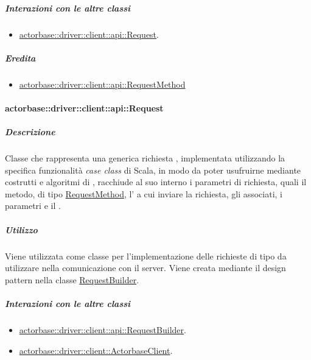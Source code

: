 \documentclass{scalatekids-article}
\begin{document}
\subparagraph{Interazioni con le altre classi}

\begin{itemize}
\item \hyperref[sec:actorbase::driver::client::api::Request]{actorbase::driver::client::api::Request}.
\end{itemize}

\subparagraph{Eredita}

\begin{itemize}
\item \hyperref[sec:actorbase::driver::client::api::RequestMethod]{actorbase::driver::client::api::RequestMethod}
\end{itemize}


\paragraph{actorbase::driver::client::api::Request}
\label{sec:actorbase::driver::client::api::Request}

\subparagraph{Descrizione}

Classe che rappresenta una generica richiesta , implementata
utilizzando la specifica funzionalità \textit{case class} di Scala, in modo da
poter usufruirne mediante costrutti e algoritmi di ,
racchiude al suo interno i parametri di richiesta, quali il metodo, di tipo
\hyperref[sec:actorbase::driver::client::api::RequestMethod]{RequestMethod},
l' a cui inviare la richiesta, gli  
associati, i parametri e il .

\subparagraph{Utilizzo}

Viene utilizzata come classe per l'implementazione delle richieste 
di tipo  da utilizzare nella comunicazione con il server. Viene
creata mediante il design pattern  nella classe
\hyperref[sec:actorbase::driver::client::api::RequestBuilder]{RequestBuilder}.

\subparagraph{Interazioni con le altre classi}

\begin{itemize}
\item \hyperref[sec:actorbase::driver::client::api::RequestBuilder]{actorbase::driver::client::api::RequestBuilder}.
\item \hyperref[sec:actorbase::driver::client::ActorbaseClient]{actorbase::driver::client::ActorbaseClient}.
\end{itemize}
\end{document}
